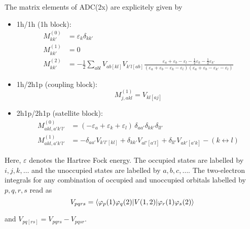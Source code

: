 The matrix elements of ADC(2x) are explicitely given by
\begin{itemize}
 \item 1h/1h (1h block):
   \begin{align}
    M_{kk'}^{(0)} &= \varepsilon_k \delta_{kk'} \\
    M_{kk'}^{(1)} &= 0 \\
    M_{kk'}^{(2)} &= -\frac12 \sum\limits_{abl} V_{ab[kl]} V_{k'l[ab]} %
                     \frac{\varepsilon_a+\varepsilon_b-\varepsilon_l
                       -\frac12 \varepsilon_k-\frac12 \varepsilon_{k'}}
                     {(\varepsilon_a+\varepsilon_b-\varepsilon_k-\varepsilon_l)
                      (\varepsilon_a+\varepsilon_b-\varepsilon_{k'}-\varepsilon_l)}
   \end{align}
 \item 1h/2h1p (coupling block):
   \begin{equation}
    M_{j,akl}^{(1)} = V_{kl[aj]}
   \end{equation}
 \item 2h1p/2h1p (satellite block):
   \begin{align}
    M_{akl,a'k'l'}^{(0)} &= (-\varepsilon_a+\varepsilon_k+\varepsilon_l)
                             \, \delta_{aa'}\delta_{kk'}\delta_{ll'} \\
    M_{akl,a'k'l'}^{(1)} &= -\delta_{aa'} V_{k'l'[kl]} + \delta_{kk'} V_{al'[a'l]}
                            +\delta_{ll'} V_{ak'[a'k]} - (k \leftrightarrow l)
   \end{align}
\end{itemize}

Here, $\varepsilon$ denotes the Hartree Fock energy. The occupied states are labelled
by $i,j,k,\dots$ and the unoccupied states are labelled by $a,b,c,\dots$. The
two-electron integrals for any combination of occupied and unoccupied orbitals
labelled by $p,q,r,s$ read as
\begin{equation}
 V_{pqrs} = \braket{\varphi_p(1)\varphi_q(2) |V(1,2)| \varphi_r(1)\varphi_s(2)}
\end{equation}

and $V_{pq[rs]} = V_{pqrs} - V_{pqsr}$.


